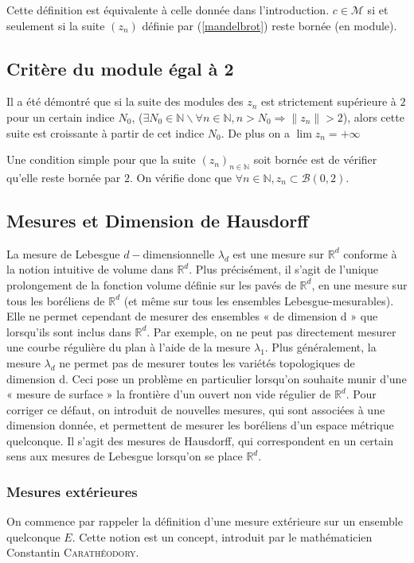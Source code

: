 \documentclass[12pt,a4paper]{article}
\theoremstyle{plain}
\theoremstyle{plain}
\theoremstyle{definition}
\theoremstyle{remark}
\begin{document}
Cette définition est équivalente à celle donnée dans l'introduction. $c \in \mathcal{M}$ si et seulement si la suite $(z_n)$ définie par (\ref{mandelbrot}) reste bornée (en module).

	\subsection{Critère du module égal à 2}\label{critère du module égal à 2}
Il a été démontré que si la suite des modules des $z_n$ est strictement supérieure à $2$ pour un certain indice $N_0$,
($\exists N_0 \in \mathbb{N} \backslash \forall n \in \mathbb{N},{} n>N_0 \Longrightarrow \|z_n\|>2$), alors cette suite est croissante à partir de cet indice $N_0$. De plus on a $\lim z_n = +\infty$

Une condition simple pour que la suite $(z_n)_{n \in \mathbb{N}}$ soit bornée est de vérifier qu'elle reste bornée par $2$. On vérifie donc que $\forall n \in \mathbb{N}, z_n \subset \mathcal{B}(0,2)$.

	\subsection{Mesures et Dimension de Hausdorff}
La mesure de Lebesgue $d-$dimensionnelle $\lambda_d$ est une mesure sur $\mathbb{R}^d$ conforme à la notion intuitive de volume dans $\mathbb{R}^d$. Plus précisément, il s’agit de l’unique prolongement de la fonction volume définie sur les pavés de $\mathbb{R}^d$, en une mesure sur tous les boréliens de $\mathbb{R}^d$ (et même sur tous les ensembles Lebesgue-mesurables). Elle ne permet cependant de mesurer des ensembles « de dimension d » que lorsqu’ils sont inclus dans $\mathbb{R}^d$. Par exemple, on ne peut pas directement mesurer une courbe régulière du plan à l’aide de la mesure $\lambda_1$. Plus généralement, la mesure $\lambda_d$ ne permet pas de mesurer toutes les variétés topologiques de dimension d. Ceci pose un problème en particulier lorsqu’on souhaite munir d’une « mesure de surface » la
frontière d’un ouvert non vide régulier de $\mathbb{R}^d$.
Pour corriger ce défaut, on introduit de nouvelles mesures, qui sont associées à une dimension donnée, et permettent de mesurer les boréliens d’un espace métrique quelconque. Il s’agit des mesures de Hausdorff, qui correspondent en un certain 
sens aux mesures de Lebesgue lorsqu’on se place $\mathbb{R}^d$.
	\subsubsection{Mesures extérieures}
On commence par rappeler la définition d'une mesure extérieure sur un ensemble quelconque $E$. Cette notion est un concept, introduit par le mathématicien Constantin \textsc{Carathéodory}. 
\end{document}

